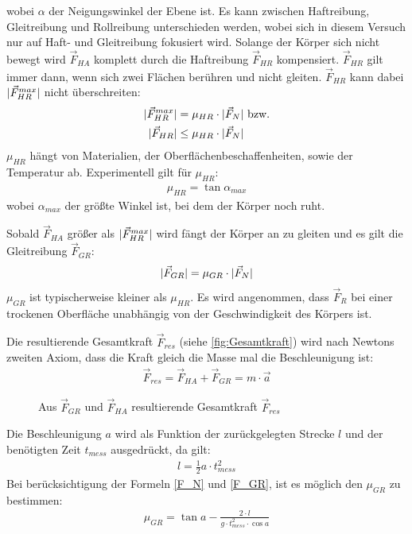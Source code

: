 wobei $\alpha$ der Neigungswinkel der Ebene ist.
Es kann zwischen Haftreibung, Gleitreibung und Rollreibung unterschieden werden, wobei sich in diesem Versuch nur auf Haft- und Gleitreibung fokusiert wird.
\newline
Solange der Körper sich nicht bewegt wird $\vec{F}_{HA}$ komplett durch die Haftreibung $\vec{F}_{HR}$ kompensiert. $\vec{F}_{HR}$ gilt immer dann, wenn sich zwei Flächen berühren und nicht gleiten. $\vec{F}_{HR}$ kann dabei $\lvert\vec{F}_{HR}^{max}\rvert$ nicht überschreiten:
\begin{subequations}
    \begin{align}
        \lvert\vec{F}_{HR}^{max}\rvert &= \mu_{HR} \cdot \lvert\vec{F}_{N}\rvert \text{ bzw.}\\
        \lvert\vec{F}_{HR}\rvert &\leq \mu_{HR} \cdot \lvert\vec{F}_{N}\rvert
    \end{align}
    \label{F_HR}
\end{subequations}
$\mu_{HR}$ hängt von Materialien, der Oberflächenbeschaffenheiten, sowie der Temperatur ab. \newline
Experimentell gilt für $\mu_{HR}$:
\begin{align}
    \mu_{HR} = \tan{\alpha_{max}}
    \label{MU_HR}
\end{align}
wobei $\alpha_{max}$ der größte Winkel ist, bei dem der Körper noch ruht.\newline

Sobald $\vec{F}_{HA}$ größer als $\lvert\vec{F}_{HR}^{max}\rvert$ wird fängt der Körper an zu gleiten und es gilt die Gleitreibung $\vec{F}_{GR}$:
\begin{align}
    \lvert\vec{F}_{GR}\rvert = \mu_{GR} \cdot \lvert\vec{F}_{N}\rvert
    \label{F_GR}
\end{align}
$\mu_{GR}$ ist typischerweise kleiner als $\mu_{HR}$. Es wird angenommen, dass $\vec{F}_{R}$ bei einer trockenen Oberfläche unabhängig von der Geschwindigkeit des Körpers ist.\smallskip

Die resultierende Gesamtkraft $\vec{F}_{res}$ (siehe \autoref{fig:Gesamtkraft}) wird nach Newtons zweiten Axiom, dass die Kraft gleich die Masse mal die Beschleunigung ist:
\begin{align}
    \vec{F}_{res} = \vec{F}_{HA} + \vec{F}_{GR} = m \cdot \vec{a}
\end{align}

\begin{figure}[ht]
    \centering
    
    \caption[Resultierende Gesamtkraft]{Aus $\vec{F}_{GR}$ und $\vec{F}_{HA}$ resultierende Gesamtkraft $\vec{F}_{res}$}
    \label{fig:Gesamtkraft}
\end{figure}

Die Beschleunigung $a$ wird als Funktion der zurückgelegten Strecke $l$ und der benötigten Zeit $t_{mess}$ ausgedrückt, da gilt:
\begin{align}
    l = \frac{1}{2} a \cdot t_{mess}^2
\end{align}
Bei berücksichtigung der Formeln \autoref{F_N} und \autoref{F_GR}, ist es möglich den $\mu_{GR}$ zu bestimmen:
\begin{align}
    \mu_{GR} = \tan{a} - \frac{2\cdot l}{g \cdot t_{mess}^2 \cdot \cos{a}}
\end{align}
